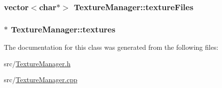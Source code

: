\hypertarget{class_texture_manager_a3a82a693ed6a11d179c5014ba70c1dc1}{
\subsubsection[{texture\-Files}]{\setlength{\rightskip}{0pt plus 5cm}vector$<$char$\ast$$>$ Texture\-Manager\-::texture\-Files}}\label{class_texture_manager_a3a82a693ed6a11d179c5014ba70c1dc1}
\hypertarget{class_texture_manager_addeef5e84ca3c522d910fe37618a20b7}{
\subsubsection[{textures}]{$\ast$ Texture\-Manager\-::textures}}\label{class_texture_manager_addeef5e84ca3c522d910fe37618a20b7}


The documentation for this class was generated from the following files\-:\begin{DoxyCompactItemize}
\item 
src/\hyperlink{_texture_manager_8h}{Texture\-Manager.\-h}\item 
src/\hyperlink{_texture_manager_8cpp}{Texture\-Manager.\-cpp}\end{DoxyCompactItemize}
